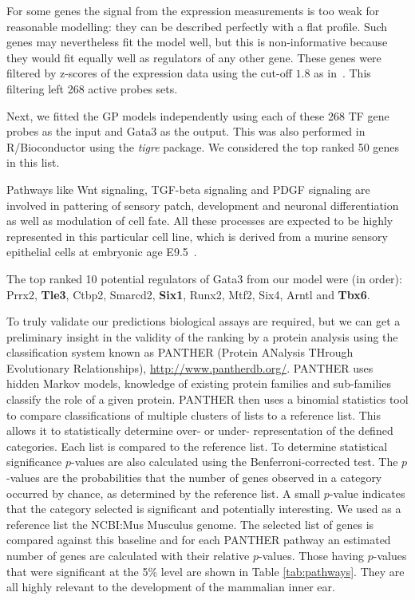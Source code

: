 \documentclass{article}
\begin{document}
For some genes the signal from the expression measurements is too weak
for reasonable modelling: they can  be described perfectly with a flat
profile.  Such genes may nevertheless  fit the model well, but this is
non-informative because  they would fit equally well  as regulators of
any  other  gene.   These  genes  were filtered  by  z-scores  of  the
expression      data     using      the      cut-off     $1.8$      as
in~\cite{Honkela:modelbased10}.  This filtering left 268 active probes
sets.

Next, we fitted the GP models independently using each of these 268 TF
gene  probes as  the input  and Gata3  as the  output.  This  was also
performed in R/Bioconductor using the \emph{tigre} package. We considered the top ranked 50 genes in this list. 

Pathways like Wnt signaling, TGF-beta signaling and PDGF signaling are
involved  in  pattering of  sensory  patch,  development and  neuronal
differentiation  as  well  as  modulation  of  cell  fate.  All  these
processes  are expected to  be highly  represented in  this particular
cell line, which is derived  from a murine sensory epithelial cells at
embryonic age E9.5~\cite{Milo2009}.

The top ranked 10 potential regulators of Gata3 from our model were
(in order): Prrx2, \textbf{Tle3}, Ctbp2, Smarcd2, \textbf{Six1}, Runx2,
Mtf2, Six4, Arntl and \textbf{Tbx6}.

To truly validate our  predictions biological assays are required, but
we can get  a preliminary insight in the validity of  the ranking by a
protein  analysis using  the  classification system  known as  PANTHER
(Protein     ANalysis     THrough     Evolutionary     Relationships),
\url{http://www.pantherdb.org/}.   PANTHER uses hidden  Markov models,
knowledge of  existing protein families and  sub-families classify the
role of a given protein.  PANTHER then uses a binomial statistics tool
to  compare  classifications  of  multiple  clusters  of  lists  to  a
reference  list. This allows  it to  statistically determine  over- or
under- representation of the defined categories. Each list is compared
to   the  reference  list.   To  determine   statistical  significance
$p$-values  are   also  calculated  using   the   Benferroni-corrected
test. The  $p$-values are the  probabilities that the number  of genes
observed  in a  category  occurred  by chance,  as  determined by  the
reference list. A small $p$-value indicates that the category selected
is significant  and potentially interesting.   We used as  a reference
list  the NCBI:Mus  Musculus genome.  The  selected list  of genes  is
compared  against  this  baseline  and  for each  PANTHER  pathway  an
estimated  number   of  genes  are  calculated   with  their  relative
$p$-values. Those  having $p$-values that were significant  at the 5\%
level  are shown  in  Table \ref{tab:pathways}.  They  are all  highly
relevant to the development of the mammalian inner ear.
\end{document}
